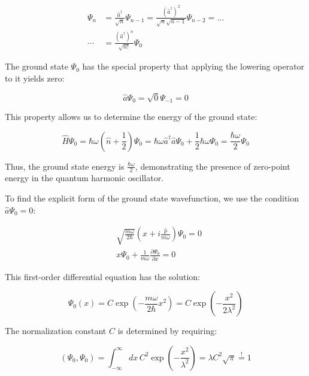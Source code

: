 \documentclass[italian]{HKNdocument}
\begin{document}
\begin{align}
\Psi_n &= \frac{\hat{a}^\dagger}{\sqrt{n}}\Psi_{n-1} = \frac{(\hat{a}^\dagger)^2}{\sqrt{n}\sqrt{n-1}}\Psi_{n-2} = \ldots \label{eq:5.37} \\
\cdots &= \frac{(\hat{a}^\dagger)^n}{\sqrt{n!}}\Psi_0
\end{align}

The ground state $\Psi_0$ has the special property that applying the lowering operator to it yields zero:

\begin{equation}
\hat{a}\Psi_0 = \sqrt{0}\Psi_{-1} = 0 \label{eq:5.38}
\end{equation}

This property allows us to determine the energy of the ground state:

\begin{equation}
\hat{H}\Psi_0 = \hbar\omega\left(\hat{n}+\frac{1}{2}\right)\Psi_0 = \hbar\omega\hat{a}^\dagger\hat{a}\Psi_0 + \frac{1}{2}\hbar\omega\Psi_0 = \frac{\hbar\omega}{2}\Psi_0 \label{eq:5.39}
\end{equation}

Thus, the ground state energy is $\frac{\hbar\omega}{2}$, demonstrating the presence of zero-point energy in the quantum harmonic oscillator.

To find the explicit form of the ground state wavefunction, we use the condition $\hat{a}\Psi_0 = 0$:

\begin{align}
&\sqrt{\frac{m\omega}{2\hbar}}\left(x + i\frac{\hat{p}}{m\omega}\right)\Psi_0 = 0 \label{eq:5.40} \\
&x\Psi_0 + \frac{1}{m\omega}\frac{\partial\Psi_0}{\partial x} = 0
\end{align}

This first-order differential equation has the solution:

\begin{equation}
\Psi_0(x) = C\exp\left(-\frac{m\omega}{2\hbar}x^2\right) = C\exp\left(-\frac{x^2}{2\lambda^2}\right) \label{eq:5.41}
\end{equation}

The normalization constant $C$ is determined by requiring:

\begin{equation}
(\Psi_0, \Psi_0) = \int_{-\infty}^{\infty}dx\,C^2\exp\left(-\frac{x^2}{\lambda^2}\right) = \lambda C^2\sqrt{\pi} \stackrel{!}{=} 1 \label{eq:5.42}
\end{equation}
\end{document}
